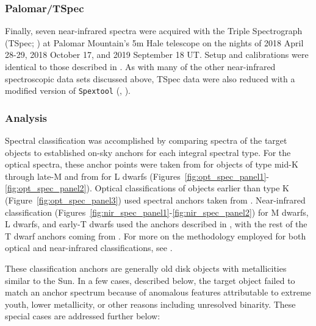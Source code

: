 \documentclass[twocolumn,tighten,twocolappendix]{aastex631}
\begin{document}
\subsubsection{Palomar/TSpec}

Finally, seven near-infrared spectra were acquired with the Triple Spectrograph (TSpec; \citealt{herter2008}) at Palomar Mountain's 5m Hale telescope on the nights of 2018 April 28-29, 2018 October 17, and 2019 September 18 UT. Setup and calibrations were identical to those described in \citealt{kirkpatrick2011}. As with many of the other near-infrared spectroscopic data sets discussed above, TSpec data were also reduced with a modified version of \texttt{Spextool} (\citealt{cushing2004}, \citealt{vacca2003}).

\subsubsection{Analysis}

Spectral classification was accomplished by comparing spectra of the target objects to established on-sky anchors for each integral spectral type. For the optical spectra, these anchor points were taken from \cite{kirkpatrick1991} for objects of type mid-K through late-M and from \cite{kirkpatrick1999} for L dwarfs (Figures~\ref{fig:opt_spec_panel1}-\ref{fig:opt_spec_panel2}). Optical classifications of objects earlier than type K (Figure~\ref{fig:opt_spec_panel3}) used spectral anchors taken from \cite{gray2009}. Near-infrared classification (Figures~\ref{fig:nir_spec_panel1}-\ref{fig:nir_spec_panel2}) for M dwarfs, L dwarfs, and early-T dwarfs used the anchors described in \cite{kirkpatrick2010}, with the rest of the T dwarf anchors coming from \cite{burgasser2006}. For more on the methodology employed for both optical and near-infrared classifications, see \cite{kirkpatrick2010}.

These classification anchors are generally old disk objects with metallicities similar to the Sun. In a few cases, described below, the target object failed to match an anchor spectrum because of anomalous features attributable to extreme youth, lower metallicity, or other reasons including unresolved binarity. These special cases are addressed further below:
\end{document}
